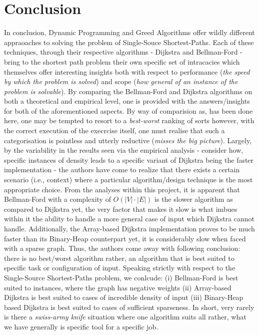 \documentclass[a4paper, 12pt]{report}
\theoremstyle{definition}
\begin{document}
\chapter{Conclusion}
In conclusion, Dynamic Programming and Greed Algorithms offer wildly different appraoaches to solving the problem of Single-Souce Shortest-Paths. Each of these techniques, through their respective algorithms - Dijkstra and Bellman-Ford
- bring to the shortest path problem their own specific set of intracacies which themselves offer interesting insights both with respect to performance (\emph{the speed by which the problem is solved}) and scope (\emph{how general of an
instance of the problem is solvable}). By comparing the Bellman-Ford and Dijkstra algorithms on both a theoretical and empirical level, one is provided with the answers/insights for both of the aforementioned aspects. By way of comparision
as, has been done here, one may be tempted to resort to a \emph{best-worst} ranking of sorts however, with the correct execution of the execrcise itself, one must realise that such a categorisation is pointless and utterly reductive (\emph{misses the big picture}).
Largely, by the variability in the results seen via the empirical analysis - consider how, specific instances of density leads to a specific variant of Dijkstra being the faster implementation - the
authors have come to realize that there exists a certain scenario (i.e., context) where a particular algorithm/design technique is the most appropriate choice. From the analyses within this project, it is apparent that Bellman-Ford with a 
complexity of \(O(|V|\cdot|E|)\) is the slower algorithm as compared to Dijkstra yet, the very factor that makes it slow is what imbues within it the ability to handle a more general case of input which Dijkstra cannot handle. Additionally,
the Array-based Dijkstra implementation proves to be much faster than its Binary-Heap counterpart yet, it is considerably slow when faced with a sparse graph. Thus, the authors come away with following conclusion:
there is no best/worst algorithm rather, an algorithm that is best suited to specific task or configuration of input. Speaking strictly with respect to the Single-Source Shortest-Paths problem, we conlcude: (i) Bellman-Ford is best suited
to instances, where the graph has negative weights (ii) Array-based Dijkstra is best suited to cases of incredible density of input (iii) Binary-Heap based Dijkstra is best suited to cases of sufficient sparseness.
In short, very rarely is there a \emph{swiss-army knife} situation where one algorithm suits all rather, what we have generally is specific tool for a specific job.

\newpage

\end{document}
